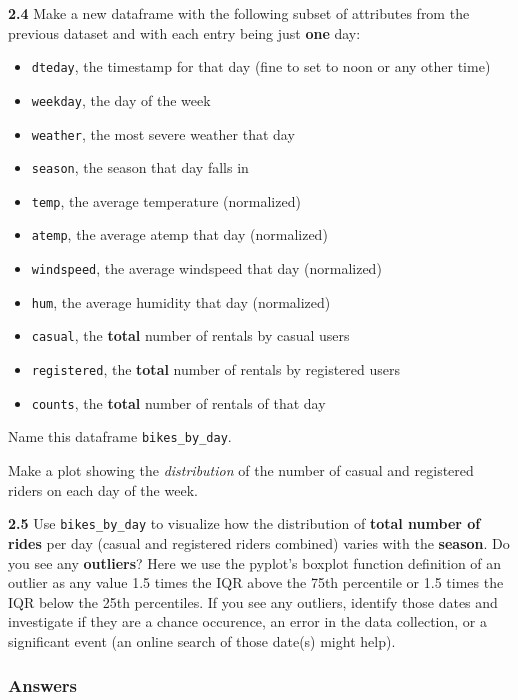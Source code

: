 \documentclass[11pt]{article}
\providecommand{\tightlist}{%
      \setlength{\itemsep}{0pt}\setlength{\parskip}{0pt}}
\begin{document}
\textbf{2.4} Make a new dataframe with the following subset of
attributes from the previous dataset and with each entry being just
\textbf{one} day:

\begin{itemize}
\tightlist
\item
  \texttt{dteday}, the timestamp for that day (fine to set to noon or
  any other time)
\item
  \texttt{weekday}, the day of the week
\item
  \texttt{weather}, the most severe weather that day
\item
  \texttt{season}, the season that day falls in
\item
  \texttt{temp}, the average temperature (normalized)
\item
  \texttt{atemp}, the average atemp that day (normalized)
\item
  \texttt{windspeed}, the average windspeed that day (normalized)
\item
  \texttt{hum}, the average humidity that day (normalized)
\item
  \texttt{casual}, the \textbf{total} number of rentals by casual users
\item
  \texttt{registered}, the \textbf{total} number of rentals by
  registered users
\item
  \texttt{counts}, the \textbf{total} number of rentals of that day
\end{itemize}

Name this dataframe \texttt{bikes\_by\_day}.

Make a plot showing the \emph{distribution} of the number of casual and
registered riders on each day of the week.

\textbf{2.5} Use \texttt{bikes\_by\_day} to visualize how the
distribution of \textbf{total number of rides} per day (casual and
registered riders combined) varies with the \textbf{season}. Do you see
any \textbf{outliers}? Here we use the pyplot's boxplot function
definition of an outlier as any value 1.5 times the IQR above the 75th
percentile or 1.5 times the IQR below the 25th percentiles. If you see
any outliers, identify those dates and investigate if they are a chance
occurence, an error in the data collection, or a significant event (an
online search of those date(s) might help).

    \subsubsection{Answers}\label{answers}
\end{document}

